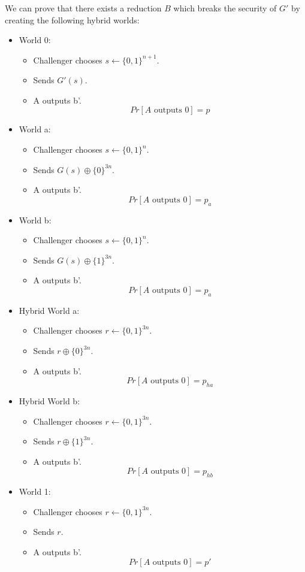 \documentclass{article}
\begin{document}
\subsubsection{}
We can prove that there exists a reduction $B$ which breaks the security of $G'$ by creating the following hybrid worlds:
    \begin{itemize}
        \item World 0: 
        \begin{itemize}
            \item Challenger chooses $s\leftarrow\{0,1\}^{n+1}$.
            \item Sends $G'(s)$.
            \item A outputs b'.
            \[Pr[A \text{ outputs }0]=p\]
        \end{itemize}
        \item World a: 
        \begin{itemize}
            \item Challenger chooses $s\leftarrow\{0,1\}^{n}$.
            \item Sends $G(s)\oplus\{0\}^{3n}$.
            \item A outputs b'.
            \[Pr[A \text{ outputs }0]=p_{a}\]
        \end{itemize}
        \item World b: 
        \begin{itemize}
            \item Challenger chooses $s\leftarrow\{0,1\}^{n}$.
            \item Sends $G(s)\oplus\{1\}^{3n}$.
            \item A outputs b'.
            \[Pr[A \text{ outputs }0]=p_{a}\]
        \end{itemize}
        \item Hybrid World a:
        \begin{itemize}
            \item Challenger chooses $r\leftarrow\{0,1\}^{3n}$.
            \item Sends $r\oplus\{0\}^{3n}$.
            \item A outputs b'.
            \[Pr[A \text{ outputs }0]=p_{ha}\]
        \end{itemize}
        \item Hybrid World b:
        \begin{itemize}
            \item Challenger chooses $r\leftarrow\{0,1\}^{3n}$.
            \item Sends $r\oplus\{1\}^{3n}$.
            \item A outputs b'.
            \[Pr[A \text{ outputs }0]=p_{hb}\]
        \end{itemize}
        \item World 1:
        \begin{itemize}
            \item Challenger chooses $r\leftarrow\{0,1\}^{3n}$.
            \item Sends $r$.
            \item A outputs b'.
            \[Pr[A \text{ outputs }0]=p'\]
        \end{itemize}
    \end{itemize}
\end{document}
